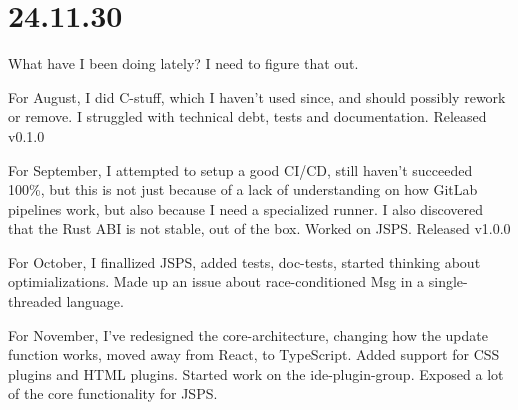 \section{24.11.30}

What have I been doing lately? I need to figure that out.

For August, I did C-stuff, which I haven't used since, and should possibly
rework or remove. I struggled with technical debt, tests and documentation.
Released v0.1.0

For September, I attempted to setup a good CI/CD, still haven't succeeded 100\%,
but this is not just because of a lack of understanding on how GitLab pipelines
work, but also because I need a specialized runner. I also discovered that the
Rust ABI is not stable, out of the box. Worked on JSPS. Released v1.0.0

For October, I finallized JSPS, added tests, doc-tests, started thinking about
optimializations. Made up an issue about race-conditioned Msg in a
single-threaded language.

For November, I've redesigned the core-architecture, changing how the update
function works, moved away from React, to TypeScript. Added support for CSS
plugins and HTML plugins. Started work on the ide-plugin-group. Exposed a lot of
the core functionality for JSPS.
